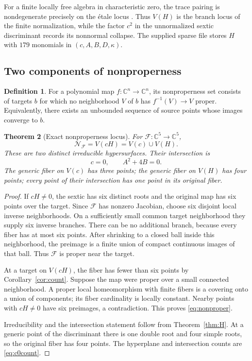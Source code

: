 \documentclass[11pt,a4paper]{article}
\newtheorem{theorem}{Theorem}[section]
\theoremstyle{definition}
\newtheorem{definition}[theorem]{Definition}
\newcommand{\C}{\mathbb C}
\newcommand{\F}{\mathcal F}
\newcommand{\kk}{\kappa}
\begin{document}
For a finite locally free algebra in characteristic zero, the trace
pairing is nondegenerate precisely on the \'etale locus
\cite[Tag 0BJF]{StacksDisc}. Thus $V(H)$ is the branch locus of the
finite normalization, while the factor $c^2$ in the unnormalized sextic
discriminant records its nonnormal collapse. The supplied sparse file
stores $H$ with $179$ monomials in $(c,A,B,D,\kk)$.

\subsection{Two components of nonproperness}
\begin{definition}
For a polynomial map $f:\C^n\to\C^n$, its nonproperness set consists
of targets $b$ for which no neighborhood $V$ of $b$ has
$f^{-1}(V)\to V$ proper. Equivalently, there exists an unbounded sequence
of source points whose images converge to $b$.
\end{definition}

\begin{theorem}[Exact nonproperness locus]\label{thm:nonproper}
For $\F:\C^5\to\C^5$,
\begin{equation}\label{eq:nonproper}
 \mathcal N_{\F}=V(cH)=V(c)\cup V(H).
\end{equation}
These are two distinct irreducible hypersurfaces. Their intersection is
\[
 c=0,\qquad A^2+4B=0.
\]
The generic fiber on $V(c)$ has three points; the generic fiber on
$V(H)$ has four points; every point of their intersection has one point
in its original fiber.
\end{theorem}
\begin{proof}
If $cH\ne0$, the sextic has six distinct roots and the original map has
six points over the target. Since $\F$ has nonzero Jacobian, choose six
disjoint local inverse neighborhoods. On a sufficiently small common
target neighborhood they supply six inverse branches. There can be no
additional branch, because every fiber has at most six points. After
shrinking to a closed ball inside this neighborhood, the preimage is
a finite union of compact continuous images of that ball. Thus $\F$ is
proper near the target.

At a target on $V(cH)$, the fiber has fewer than six points by
Corollary~\ref{cor:count}. Suppose the map were proper over a small
connected neighborhood. A proper local homeomorphism with finite fibers
is a covering onto a union of components; its fiber cardinality is
locally constant. Nearby points with $cH\ne0$ have six preimages, a
contradiction. This proves \eqref{eq:nonproper}.

Irreducibility and the intersection statement follow from
Theorem~\ref{thm:H}. At a generic point of the discriminant there is one
double root and four simple roots, so the original fiber has four
points. The hyperplane and intersection counts are
\eqref{eq:c0count}.
\end{proof}
\end{document}
